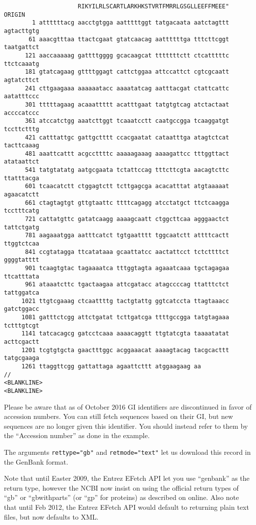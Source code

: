 \begin{verbatim}
                     RIKYILRLSCARTLARKHKSTVRTFMRRLGSGLLEEFFMEEE"
ORIGIN      
        1 attttttacg aacctgtgga aatttttggt tatgacaata aatctagttt agtacttgtg
       61 aaacgtttaa ttactcgaat gtatcaacag aattttttga tttcttcggt taatgattct
      121 aaccaaaaag gattttgggg gcacaagcat tttttttctt ctcatttttc ttctcaaatg
      181 gtatcagaag gttttggagt cattctggaa attccattct cgtcgcaatt agtatcttct
      241 cttgaagaaa aaaaaatacc aaaatatcag aatttacgat ctattcattc aatatttccc
      301 tttttagaag acaaattttt acatttgaat tatgtgtcag atctactaat accccatccc
      361 atccatctgg aaatcttggt tcaaatcctt caatgccgga tcaaggatgt tccttctttg
      421 catttattgc gattgctttt ccacgaatat cataatttga atagtctcat tacttcaaag
      481 aaattcattt acgccttttc aaaaagaaag aaaagattcc tttggttact atataattct
      541 tatgtatatg aatgcgaata tctattccag tttcttcgta aacagtcttc ttatttacga
      601 tcaacatctt ctggagtctt tcttgagcga acacatttat atgtaaaaat agaacatctt
      661 ctagtagtgt gttgtaattc ttttcagagg atcctatgct ttctcaagga tcctttcatg
      721 cattatgttc gatatcaagg aaaagcaatt ctggcttcaa agggaactct tattctgatg
      781 aagaaatgga aatttcatct tgtgaatttt tggcaatctt attttcactt ttggtctcaa
      841 ccgtatagga ttcatataaa gcaattatcc aactattcct tctcttttct ggggtatttt
      901 tcaagtgtac tagaaaatca tttggtagta agaaatcaaa tgctagagaa ttcatttata
      961 ataaatcttc tgactaagaa attcgatacc atagccccag ttatttctct tattggatca
     1021 ttgtcgaaag ctcaattttg tactgtattg ggtcatccta ttagtaaacc gatctggacc
     1081 gatttctcgg attctgatat tcttgatcga ttttgccgga tatgtagaaa tctttgtcgt
     1141 tatcacagcg gatcctcaaa aaaacaggtt ttgtatcgta taaaatatat acttcgactt
     1201 tcgtgtgcta gaactttggc acggaaacat aaaagtacag tacgcacttt tatgcgaaga
     1261 ttaggttcgg gattattaga agaattcttt atggaagaag aa
//
<BLANKLINE>
<BLANKLINE>
\end{verbatim}

Please be aware that as of October 2016 GI identifiers are discontinued in favor of accession numbers. You can still fetch sequences based on their GI, but new sequences are no longer given this identifier. You should instead refer to them by the ``Accession number'' as done in the example.

The arguments \verb+rettype="gb"+ and \verb+retmode="text"+ let us download this record in the GenBank format.

Note that until Easter 2009, the Entrez EFetch API let you use ``genbank'' as the
return type, however the NCBI now insist on using the official return types of
``gb'' or ``gbwithparts'' (or ``gp'' for proteins) as described on online.
Also note that until Feb 2012, the Entrez EFetch API would default to returning
plain text files, but now defaults to XML.

